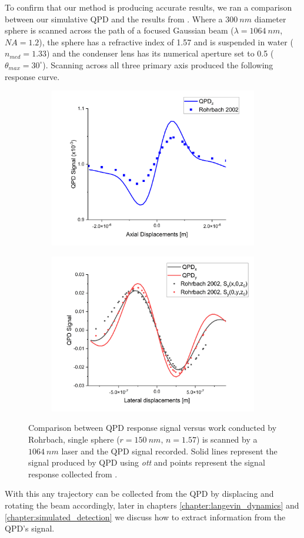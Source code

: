 To confirm that our method is producing accurate results, we ran a comparison
between our simulative QPD and the results from \cite{Rohrbach2002}. Where a 
$300\ nm$ diameter sphere is scanned across the path of a focused Gaussian beam
($\lambda=1064\ nm$, $NA=1.2$), the sphere has a refractive index of 1.57 and is
suspended in water ($n_{med}=1.33$) and the condenser lens has its numerical aperture
set to 0.5 ($\theta_{max} = 30^\circ$). Scanning across all three primary axis 
produced the following response curve.
\begin{figure}[h!]
	\label{fig:Rohrbach}
	\begin{subfigure}{0.475 \linewidth}
		\subcaption{}
		\includegraphics[width=\linewidth]{QPD_axial_tests.png}
	\end{subfigure}
	\begin{subfigure}{0.475 \linewidth}
		\subcaption{}
		\includegraphics[width=\linewidth]{QPD_lat_tests.png}
	\end{subfigure}
	\caption{Comparison between QPD response signal versus work conducted by Rohrbach, single sphere ($r = 150\ nm$, $n=1.57$) is scanned by a $1064\ nm$ laser and the QPD signal recorded. Solid lines represent the signal produced by QPD using \textit{ott} and points represent the signal response collected from \cite{Rohrbach2002}.}
\end{figure}

With this any trajectory can be collected from the QPD by displacing and 
rotating the beam accordingly, later in chapters \ref{chapter:langevin_dynamics} 
and \ref{chapter:simulated_detection} we discuss how to extract information 
from the QPD's signal.
